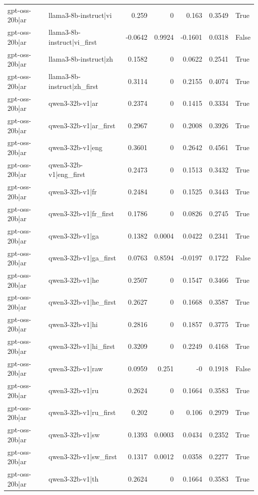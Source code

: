 \begin{table}
\begin{tabular}{l l r r r r l}
gpt-oss-20b|ar & llama3-8b-instruct|vi & 0.259 & 0 & 0.163 & 0.3549 & True \\
gpt-oss-20b|ar & llama3-8b-instruct|vi_first & -0.0642 & 0.9924 & -0.1601 & 0.0318 & False \\
gpt-oss-20b|ar & llama3-8b-instruct|zh & 0.1582 & 0 & 0.0622 & 0.2541 & True \\
gpt-oss-20b|ar & llama3-8b-instruct|zh_first & 0.3114 & 0 & 0.2155 & 0.4074 & True \\
gpt-oss-20b|ar & qwen3-32b-v1|ar & 0.2374 & 0 & 0.1415 & 0.3334 & True \\
gpt-oss-20b|ar & qwen3-32b-v1|ar_first & 0.2967 & 0 & 0.2008 & 0.3926 & True \\
gpt-oss-20b|ar & qwen3-32b-v1|eng & 0.3601 & 0 & 0.2642 & 0.4561 & True \\
gpt-oss-20b|ar & qwen3-32b-v1|eng_first & 0.2473 & 0 & 0.1513 & 0.3432 & True \\
gpt-oss-20b|ar & qwen3-32b-v1|fr & 0.2484 & 0 & 0.1525 & 0.3443 & True \\
gpt-oss-20b|ar & qwen3-32b-v1|fr_first & 0.1786 & 0 & 0.0826 & 0.2745 & True \\
gpt-oss-20b|ar & qwen3-32b-v1|ga & 0.1382 & 0.0004 & 0.0422 & 0.2341 & True \\
gpt-oss-20b|ar & qwen3-32b-v1|ga_first & 0.0763 & 0.8594 & -0.0197 & 0.1722 & False \\
gpt-oss-20b|ar & qwen3-32b-v1|he & 0.2507 & 0 & 0.1547 & 0.3466 & True \\
gpt-oss-20b|ar & qwen3-32b-v1|he_first & 0.2627 & 0 & 0.1668 & 0.3587 & True \\
gpt-oss-20b|ar & qwen3-32b-v1|hi & 0.2816 & 0 & 0.1857 & 0.3775 & True \\
gpt-oss-20b|ar & qwen3-32b-v1|hi_first & 0.3209 & 0 & 0.2249 & 0.4168 & True \\
gpt-oss-20b|ar & qwen3-32b-v1|raw & 0.0959 & 0.251 & -0 & 0.1918 & False \\
gpt-oss-20b|ar & qwen3-32b-v1|ru & 0.2624 & 0 & 0.1664 & 0.3583 & True \\
gpt-oss-20b|ar & qwen3-32b-v1|ru_first & 0.202 & 0 & 0.106 & 0.2979 & True \\
gpt-oss-20b|ar & qwen3-32b-v1|sw & 0.1393 & 0.0003 & 0.0434 & 0.2352 & True \\
gpt-oss-20b|ar & qwen3-32b-v1|sw_first & 0.1317 & 0.0012 & 0.0358 & 0.2277 & True \\
gpt-oss-20b|ar & qwen3-32b-v1|th & 0.2624 & 0 & 0.1664 & 0.3583 & True \\

\end{tabular}
\end{table}
